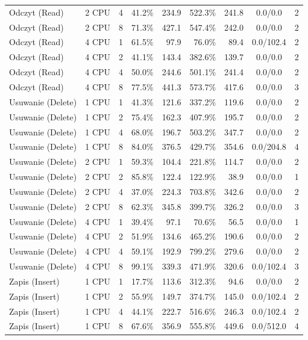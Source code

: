 \begin{table}[ht]
{\begin{tabular}{llcrrrrcc}
Odczyt (Read) & 2 CPU & 4 & 41.2\% & 234.9 & 522.3\% & 241.8 & 0.0/0.0 & 2 \\
Odczyt (Read) & 2 CPU & 8 & 71.3\% & 427.1 & 547.4\% & 242.0 & 0.0/0.0 & 2 \\
Odczyt (Read) & 4 CPU & 1 & 61.5\% & 97.9 & 76.0\% & 89.4 & 0.0/102.4 & 2 \\
Odczyt (Read) & 4 CPU & 2 & 41.1\% & 143.4 & 382.6\% & 139.7 & 0.0/0.0 & 2 \\
Odczyt (Read) & 4 CPU & 4 & 50.0\% & 244.6 & 501.1\% & 241.4 & 0.0/0.0 & 2 \\
Odczyt (Read) & 4 CPU & 8 & 77.5\% & 441.3 & 573.7\% & 417.6 & 0.0/0.0 & 3 \\
Usuwanie (Delete) & 1 CPU & 1 & 41.3\% & 121.6 & 337.2\% & 119.6 & 0.0/0.0 & 2 \\
Usuwanie (Delete) & 1 CPU & 2 & 75.4\% & 162.3 & 407.9\% & 195.7 & 0.0/0.0 & 2 \\
Usuwanie (Delete) & 1 CPU & 4 & 68.0\% & 196.7 & 503.2\% & 347.7 & 0.0/0.0 & 2 \\
Usuwanie (Delete) & 1 CPU & 8 & 84.0\% & 376.5 & 429.7\% & 354.6 & 0.0/204.8 & 4 \\
Usuwanie (Delete) & 2 CPU & 1 & 59.3\% & 104.4 & 221.8\% & 114.7 & 0.0/0.0 & 2 \\
Usuwanie (Delete) & 2 CPU & 2 & 85.8\% & 122.4 & 122.9\% & 38.9 & 0.0/0.0 & 1 \\
Usuwanie (Delete) & 2 CPU & 4 & 37.0\% & 224.3 & 703.8\% & 342.6 & 0.0/0.0 & 2 \\
Usuwanie (Delete) & 2 CPU & 8 & 62.3\% & 345.8 & 399.7\% & 326.2 & 0.0/0.0 & 3 \\
Usuwanie (Delete) & 4 CPU & 1 & 39.4\% & 97.1 & 70.6\% & 56.5 & 0.0/0.0 & 1 \\
Usuwanie (Delete) & 4 CPU & 2 & 51.9\% & 134.6 & 465.2\% & 190.6 & 0.0/0.0 & 2 \\
Usuwanie (Delete) & 4 CPU & 4 & 59.1\% & 192.9 & 799.2\% & 279.6 & 0.0/0.0 & 2 \\
Usuwanie (Delete) & 4 CPU & 8 & 99.1\% & 339.3 & 471.9\% & 320.6 & 0.0/102.4 & 3 \\
Zapis (Insert) & 1 CPU & 1 & 17.7\% & 113.6 & 312.3\% & 94.6 & 0.0/0.0 & 2 \\
Zapis (Insert) & 1 CPU & 2 & 55.9\% & 149.7 & 374.7\% & 145.0 & 0.0/102.4 & 2 \\
Zapis (Insert) & 1 CPU & 4 & 44.1\% & 222.7 & 516.6\% & 246.3 & 0.0/102.4 & 2 \\
Zapis (Insert) & 1 CPU & 8 & 67.6\% & 356.9 & 555.8\% & 449.6 & 0.0/512.0 & 4 \\

\end{tabular}}
\end{table}
